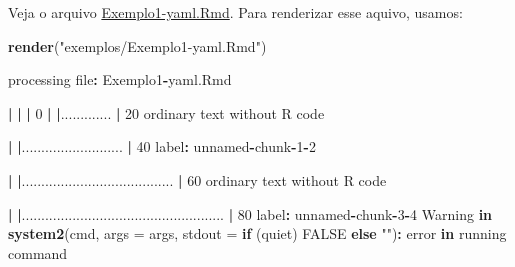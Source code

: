 \documentclass[10pt,a4paper]{book}
\newenvironment{Shaded}{\begin{snugshade}}{\end{snugshade}}
\newcommand{\KeywordTok}[1]{\textcolor[rgb]{0.13,0.29,0.53}{\textbf{#1}}}
\newcommand{\DataTypeTok}[1]{\textcolor[rgb]{0.13,0.29,0.53}{#1}}
\newcommand{\DecValTok}[1]{\textcolor[rgb]{0.00,0.00,0.81}{#1}}
\newcommand{\StringTok}[1]{\textcolor[rgb]{0.31,0.60,0.02}{#1}}
\newcommand{\OtherTok}[1]{\textcolor[rgb]{0.56,0.35,0.01}{#1}}
\newcommand{\ControlFlowTok}[1]{\textcolor[rgb]{0.13,0.29,0.53}{\textbf{#1}}}
\newcommand{\OperatorTok}[1]{\textcolor[rgb]{0.81,0.36,0.00}{\textbf{#1}}}
\newcommand{\ErrorTok}[1]{\textcolor[rgb]{0.64,0.00,0.00}{\textbf{#1}}}
\newcommand{\NormalTok}[1]{#1}
\begin{document}
Veja o arquivo \href{exemplos/Exemplo1-yaml.Rmd}{Exemplo1-yaml.Rmd}.
Para renderizar esse aquivo, usamos:

\begin{Shaded}
\begin{Highlighting}[]
\KeywordTok{render}\NormalTok{(}\StringTok{"exemplos/Exemplo1-yaml.Rmd"}\NormalTok{)}


\NormalTok{processing file}\OperatorTok{:}\StringTok{ }\NormalTok{Exemplo1}\OperatorTok{-}\NormalTok{yaml.Rmd}

  \OperatorTok{|}\StringTok{                                                                       }
\StringTok{  }\ErrorTok{|}\StringTok{                                                                 }\ErrorTok{|}\StringTok{   }\DecValTok{0}\NormalTok{%
  \OperatorTok{|}\StringTok{                                                                       }
\StringTok{  }\ErrorTok{|}\NormalTok{.............                                                    }\OperatorTok{|}\StringTok{  }\DecValTok{20}\NormalTok{%
\NormalTok{  ordinary text without R code}


  \OperatorTok{|}\StringTok{                                                                       }
\StringTok{  }\ErrorTok{|}\NormalTok{..........................                                       }\OperatorTok{|}\StringTok{  }\DecValTok{40}\NormalTok{%
\NormalTok{label}\OperatorTok{:}\StringTok{ }\NormalTok{unnamed}\OperatorTok{-}\NormalTok{chunk}\OperatorTok{-}\DecValTok{1}\OperatorTok{-}\DecValTok{2}

  \OperatorTok{|}\StringTok{                                                                       }
\StringTok{  }\ErrorTok{|}\NormalTok{.......................................                          }\OperatorTok{|}\StringTok{  }\DecValTok{60}\NormalTok{%
\NormalTok{  ordinary text without R code}


  \OperatorTok{|}\StringTok{                                                                       }
\StringTok{  }\ErrorTok{|}\NormalTok{....................................................             }\OperatorTok{|}\StringTok{  }\DecValTok{80}\NormalTok{%
\NormalTok{label}\OperatorTok{:}\StringTok{ }\NormalTok{unnamed}\OperatorTok{-}\NormalTok{chunk}\OperatorTok{-}\DecValTok{3}\OperatorTok{-}\DecValTok{4}
\NormalTok{Warning }\ControlFlowTok{in} \KeywordTok{system2}\NormalTok{(cmd, }\DataTypeTok{args =}\NormalTok{ args, }\DataTypeTok{stdout =} \ControlFlowTok{if}\NormalTok{ (quiet) }\OtherTok{FALSE} \ControlFlowTok{else} \StringTok{""}\NormalTok{)}\OperatorTok{:}
\NormalTok{error }\ControlFlowTok{in}\NormalTok{ running command}

}}}}}
\end{Highlighting}
\end{Shaded}
\end{document}

